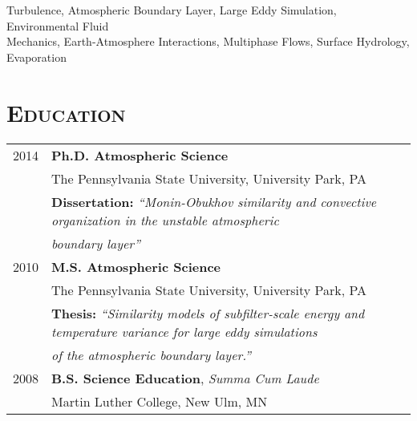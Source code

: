 \documentclass[11pt,letterpaper]{article}
\begin{document}
Turbulence, Atmospheric Boundary Layer, Large Eddy Simulation, Environmental Fluid \\ Mechanics,
Earth-Atmosphere Interactions, Multiphase Flows, Surface Hydrology, Evaporation 


\section*{\textsc{Education}}
\begin{tabular}{l l}
2014 & \textbf{Ph.D. Atmospheric Science} \\
      & The Pennsylvania State University, University Park, PA \\
      & {\small \textbf{Dissertation:}} \textit{\small``Monin-Obukhov similarity and convective organization in the unstable atmospheric}\\
      & \textit{\small boundary layer''} \\[1.5\parskip]

2010 & \textbf{M.S. Atmospheric Science} \\
      & The Pennsylvania State University, University Park, PA \\
      & {\small \textbf{Thesis:}} \textit{\small ``Similarity models of subfilter-scale energy and temperature variance for large eddy simulations} \\
      & \textit{\small of the atmospheric boundary layer.''} \\[1.5\parskip]

2008 & \textbf{B.S. Science Education}, \textit{Summa Cum Laude} \\
              & Martin Luther College, New Ulm, MN
\end{tabular}

\end{document}
